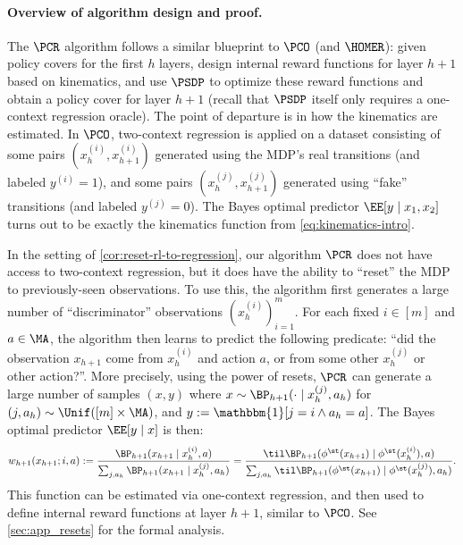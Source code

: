 \paragraph{Overview of algorithm design and proof.}
The $\PCR$ algorithm follows a similar blueprint to $\PCO$ (and $\HOMER$): given policy covers for the first $h$ layers, design internal reward functions for layer $h+1$ based on kinematics, and use $\PSDP$ to optimize these reward functions and obtain a policy cover for layer $h+1$ (recall that $\PSDP$ itself only requires a one-context regression oracle). The point of departure is in how the kinematics are estimated. In $\PCO$, two-context regression is applied on a dataset consisting of some pairs $(x_h^{(i)},x_{h+1}^{(i)})$ generated using the MDP's real transitions (and labeled $y^{(i)} = 1$), and some pairs $(x_h^{(j)}, x_{h+1}^{(j)})$ generated using ``fake'' transitions (and labeled $y^{(j)} = 0$). The Bayes optimal predictor $\EE[y\mid{}x_1,x_2]$ turns out to be exactly the kinematics function from \cref{eq:kinematics-intro}.

In the setting of \cref{cor:reset-rl-to-regression}, our algorithm $\PCR$ does not have access to two-context regression, but it does have the ability to ``reset'' the MDP to previously-seen observations. To use this, the algorithm first generates a large number of ``discriminator'' observations $(x_h^{(i)})_{i=1}^m$. For each fixed $i \in [m]$ and $a \in \MA$, the algorithm then learns to predict the following predicate: ``did the observation $x_{h+1}$ come from $x_h^{(i)}$ and action $a$, or from some other $x_h^{(j)}$ or other action?''. More precisely, using the power of resets, $\PCR$ can generate a large number of samples $(x,y)$ where $x \sim \BP_{h+1}(\cdot\mid{}x_h^{(j)},a_h)$ for $(j,a_h) \sim \Unif([m]\times\MA)$, and $y := \mathbbm{1}[j=i \land a_h=a]$. The Bayes optimal predictor $\EE[y\mid{}x]$ is then:\loose
\begin{equation} w_{h+1}(x_{h+1};i,a) := \frac{\BP_{h+1}(x_{h+1}\mid{}x_h^{(i)},a)}{\sum_{j,a_h} \BP_{h+1}(x_{h+1}\mid{}x_h^{(j)},a_h)} = \frac{\til\BP_{h+1}(\phi^\st(x_{h+1})\mid{}\phi^\st(x_h^{(i)}),a)}{\sum_{j,a_h} \til\BP_{h+1}(\phi^\st(x_{h+1})\mid{}\phi^\st(x_h^{(j)}),a_h)}.\label{eq:pcr-kinematics}\end{equation}
This function can be estimated via one-context regression, and then used to define internal reward functions at layer $h+1$, similar to $\PCO$. See \cref{sec:app_resets} for the formal analysis. %

